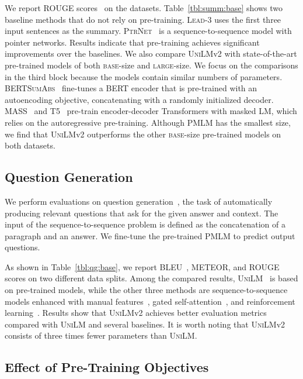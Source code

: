 \documentclass{article}
\newcommand\pmlm{\textsc{PMLM}}
\newcommand{\unilmvone}{\textsc{UniLM}}
\newcommand{\vonelarge}{\textsc{UniLM}}
\newcommand{\vtwobase}{\textsc{UniLM}v2}
\begin{document}
We report ROUGE scores~\cite{lin-2004-rouge} on the datasets.
Table~\ref{tbl:summ:base} shows two baseline methods that do not rely on pre-training.
\textsc{Lead}-3 uses the first three input sentences as the summary.
\textsc{PtrNet}~\cite{see-2017-get} is a sequence-to-sequence model with pointer networks.
Results indicate that pre-training achieves significant improvements over the baselines.
We also compare \vtwobase{} with state-of-the-art pre-trained models of both \textsc{base}-size and \textsc{large}-size.
We focus on the comparisons in the third block because the models contain similar numbers of parameters.
\textsc{BERTSumAbs}~\cite{bertsum} fine-tunes a BERT encoder that is pre-trained with an autoencoding objective, concatenating with a randomly initialized decoder.
MASS~\cite{mass} and T5~\cite{t5} pre-train encoder-decoder Transformers with masked LM, which relies on the autoregressive pre-training.
Although \pmlm{} has the smallest size, we find that \vtwobase{} outperforms the other \textsc{base}-size pre-trained models on both datasets.


\subsection{Question Generation}

We perform evaluations on question generation~\cite{du-qg-2018}, the task of automatically producing relevant questions that ask for the given answer and context.
The input of the sequence-to-sequence problem is defined as the concatenation of a paragraph and an answer.
We fine-tune the pre-trained \pmlm{} to predict output questions.

As shown in Table~\ref{tbl:qg:base}, we report BLEU~\cite{bleu}, METEOR\cite{meteor}, and ROUGE~\cite{lin-2004-rouge} scores on two different data splits.
Among the compared results, \unilmvone{}~\cite{unilm} is based on pre-trained models, while the other three methods are sequence-to-sequence models enhanced with manual features~\cite{du-qg-2018}, gated self-attention~\cite{zhao-qg-2018}, and reinforcement learning~\cite{zhang-qg-2019}.
Results show that \vtwobase{} achieves better evaluation metrics compared with \vonelarge{} and several baselines.
It is worth noting that \vtwobase{} consists of three times fewer parameters than \vonelarge{}.

\subsection{Effect of Pre-Training Objectives}
\label{sec:effect:obj}
\end{document}
